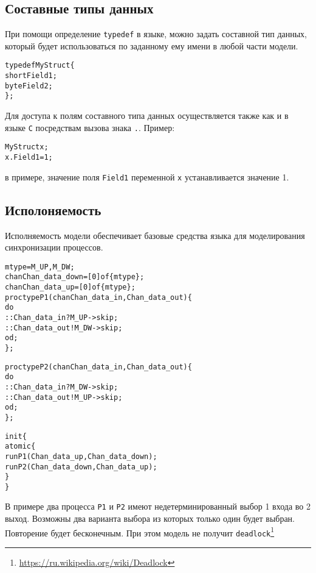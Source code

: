 \documentclass[12pt, twoside]{report}
\begin{document}
\subsection*{Составные типы данных}\label{promela_language_STRUCT}

При помощи определение \texttt{typedef} в языке, можно задать составной тип данных,
который будет использоваться по заданному ему имени в любой части модели.
\begin{alltt}
typedef MyStruct \{
    short Field1;
    byte  Field2;
\};
\end{alltt}
Для доступа к полям составного типа данных осуществляется также как и в языке
\texttt{C} посредствам вызова знака \texttt{.}. Пример:
\begin{alltt}
MyStruct x;
x.Field1 = 1;
\end{alltt}
в примере, значение поля \texttt{Field1} переменной \texttt{x} устанавливается
значение 1.

\subsection*{Исполоняемость}\label{promela_language_EXECUTABILITY}

Исполняемость модели обеспечивает базовые средства языка для моделирования
синхронизации процессов.

\begin{alltt}
mtype = {M_UP, M_DW};
chan Chan_data_down = [0] of \{mtype\};
chan Chan_data_up   = [0] of \{mtype\};
proctype P1 (chan Chan_data_in, Chan_data_out) \{
    do
    ::  Chan_data_in  ? M_UP -> skip;
    ::  Chan_data_out ! M_DW -> skip;
    od;
\};

proctype P2 (chan Chan_data_in, Chan_data_out) \{
    do
    ::  Chan_data_in  ? M_DW -> skip;
    ::  Chan_data_out ! M_UP -> skip;
    od;
\};

init \{
    atomic \{
        run P1 (Chan_data_up,   Chan_data_down);
        run P2 (Chan_data_down, Chan_data_up);
    \}
\}
\end{alltt}
В примере два процесса \texttt{P1} и \texttt{P2} имеют недетерминированный выбор 1 входа во 2 выход.
Возможны два варианта выбора из которых только один будет выбран.
Повторение будет бесконечным. При этом модель не получит \texttt{deadlock}\footnote{\url{https://ru.wikipedia.org/wiki/Deadlock}}
\end{document}
